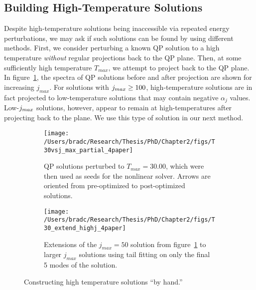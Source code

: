 \documentclass[../PhD.tex]{subfiles}
\begin{document}
\subsection{Building High-Temperature Solutions}
\label{ssec: by hand highT}

Despite high-temperature solutions being inaccessible via repeated energy perturbations, we may ask if such solutions can be found by using different methods. First, we consider perturbing a known QP solution to a high temperature \emph{without} regular projections back to the QP plane. Then, at some sufficiently high temperature $T_{max}$, we attempt to project back to the QP plane. In figure~\ref{fig: T30 vs j_max}, the spectra of QP solutions before and after projection are shown for increasing $j_{max}$. For solutions with $j_{max} \geq 100$, high-temperature solutions are in fact projected to low-temperature solutions that may contain negative $\alpha_j$ values. Low-$j_{max}$ solutions, however, appear to remain at high-temperatures after projecting back to the plane. We use this type of solution in our next method.

\begin{figure}[h]
	\centering
	\begin{subfigure}[t]{0.45\textwidth}
		\texttt{[image: /Users/bradc/Research/Thesis/PhD/Chapter2/figs/T30vsj\_max\_partial\_4paper]}
		\caption{QP solutions perturbed to $T_{max}=30.00$, which were then used as seeds for the nonlinear solver. Arrows are oriented from pre-optimized to post-optimized solutions.}
		\label{fig: T30 vs j_max}
	\end{subfigure}
	\;
	\begin{subfigure}[t]{0.45\textwidth}
		\texttt{[image: /Users/bradc/Research/Thesis/PhD/Chapter2/figs/T30\_extend\_highj\_4paper]}
		\caption{Extensions of the $j_{max}=50$ solution from figure~\ref{fig: T30 vs j_max} to larger $j_{max}$ solutions using tail fitting on only the final 5 modes of the solution.}
		\label{fig: manual highT}
	\end{subfigure}
	\caption{Constructing high temperature solutions ``by hand.''}
	\label{fig: making highT}
\end{figure}
\end{document}
